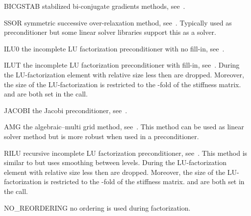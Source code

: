 \begin{memberdesc}[LinearPDE]{BICGSTAB}
stabilized bi-conjugate gradients methods, see~.
\end{memberdesc}

\begin{memberdesc}[LinearPDE]{SSOR}
symmetric successive over-relaxation method, see~. Typically used as preconditioner but some linear solver libraries support
this as a solver.
\end{memberdesc}
\begin{memberdesc}[LinearPDE]{ILU0}
the incomplete LU factorization preconditioner with no fill-in, see~.
\end{memberdesc}

\begin{memberdesc}[LinearPDE]{ILUT}
the incomplete LU factorization preconditioner with fill-in, see~. During the  LU-factorization element with
relative size less then  are dropped. Moreover, the size of the LU-factorization is restricted to the
-fold of the stiffness matrix.  and  are both set in the
 call.
\end{memberdesc}

\begin{memberdesc}[LinearPDE]{JACOBI}
the Jacobi preconditioner, see~.
\end{memberdesc}

\begin{memberdesc}[LinearPDE]{AMG}
the algebraic--multi grid method, see~. This method can be used as linear solver method but is more robust when used
in a preconditioner.
\end{memberdesc}

\begin{memberdesc}[LinearPDE]{RILU}
recursive incomplete LU factorization preconditioner, see~. This method is similar to \ILUT but uses smoothing
between levels. During the  LU-factorization element with
relative size less then  are dropped. Moreover, the size of the LU-factorization is restricted to the
-fold of the stiffness matrix.  and  are both set in the
 call.
\end{memberdesc}

\begin{memberdesc}[LinearPDE]{NO_REORDERING}
no ordering is used during factorization.
\end{memberdesc}

